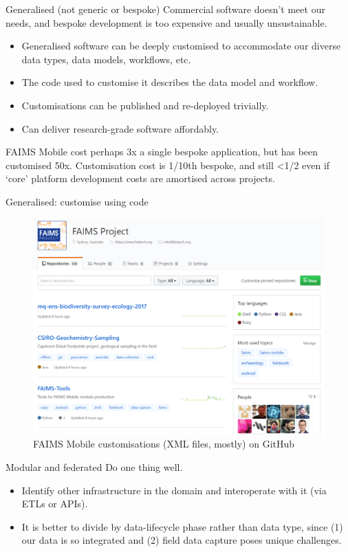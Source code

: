 \documentclass[aspectratio=169, 12pt]{beamer} %
\begin{document}
\begin{frame}{Generalised (not generic or bespoke)}
  Commercial software doesn't meet our needs, and bespoke development is too expensive and usually unsustainable.
      \begin{itemize}[label=\textbullet]
        \item Generalised software can be deeply customised to accommodate our diverse data types, data models, workflows, etc.
        \item The code used to customise it describes the data model and workflow.
        \item Customisations can be published and re-deployed trivially.
        \item Can deliver research-grade software affordably.  
    \end{itemize}
    FAIMS Mobile cost perhaps 3x a single bespoke application, but has been customised 50x. Customisation cost is 1/10th bespoke, and still <1/2 even if `core' platform development costs are amortised across projects.
\end{frame}

\begin{frame}{Generalised: customise using code}
 \begin{figure}[H]
    \centering
        \includegraphics[height=.75\textheight]{figures/FAIMS-generalised.png}
        \caption{FAIMS Mobile customisations (XML files, mostly) on GitHub}
        \label{fig:figure11}
 \end{figure}
\end{frame}

\begin{frame}{Modular and federated}
  Do one thing well.
      \begin{itemize}[label=\textbullet]
        \item Identify other infrastructure in the domain and interoperate with it (via ETLs or APIs).
        \item It is better to divide by data-lifecycle phase rather than data type, since (1) our data is so integrated and (2) field data capture poses unique challenges.
    \end{itemize}
\end{frame}
\end{document}
